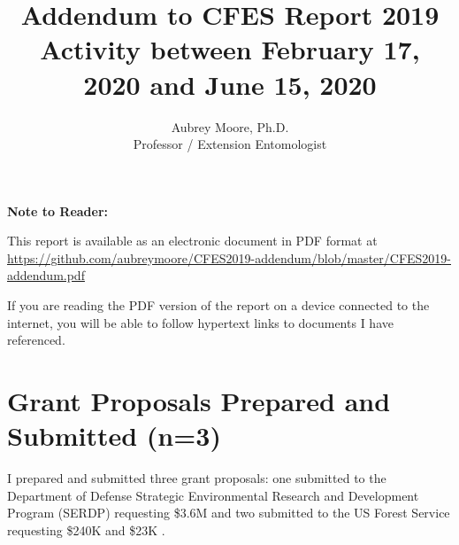 

\usepackage[breaklinks=true, colorlinks=True, allcolors=blue]{hyperref}

\usepackage{indentfirst} 
\usepackage{comment}

\newcommand{\activities}{\medskip\textbf{Activities}}
\newcommand{\plans}{\medskip\textbf{Plans}}

\makeatletter

\makeatother




\title{Addendum to CFES Report 2019\\ \large{Activity between February 17, 2020 and June 15, 2020}}

\author{Aubrey Moore, Ph.D.\\
Professor / Extension Entomologist}

\maketitle

\textbf{Note to Reader:}

This report is available as an electronic document in PDF format at\\
\footnotesize{\url{https://github.com/aubreymoore/CFES2019-addendum/blob/master/CFES2019-addendum.pdf}} 

If you are reading the PDF version of the report on a device connected
to the internet, you will be able to follow hypertext links to documents
I have referenced.

\setcounter{tocdepth}{2}
\tableofcontents{}

\clearpage

\section{Grant Proposals Prepared and Submitted (n=3)}
\begin{refsection}

I prepared and submitted three grant proposals: one submitted to the Department of Defense Strategic Environmental Research and Development Program (SERDP) requesting \$3.6M \cite{moore_serdp_2020-1} and two submitted to the US Forest Service requesting \$240K and \$23K \cite{moore_grant_2020-1, moore_grant_2020}.	

\printbibliography[heading=none]
\end{refsection} 



